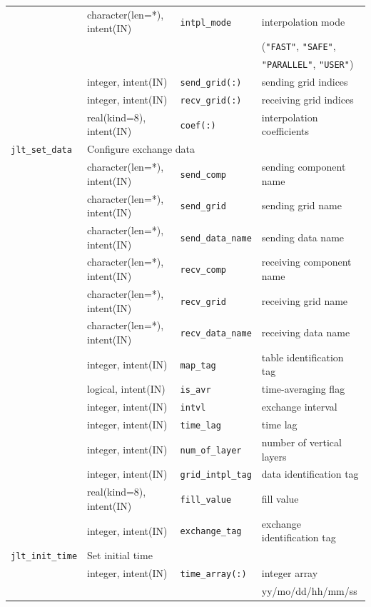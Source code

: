 \documentclass[11pt,a4paper]{report}
\begin{document}
\begin{table}[H]
\begin{center}
{\begin{tabular}{llll}
                & character(len=*), intent(IN) & \texttt{intpl\_mode} & interpolation mode\\
                &  &  & (\texttt{"FAST"}, \texttt{"SAFE"},\\
                &  &  & \texttt{"PARALLEL"}, \texttt{"USER"})\\
                & integer, intent(IN) & \texttt{send\_grid(:)} & sending grid indices\\
                & integer, intent(IN) & \texttt{recv\_grid(:)} & receiving grid indices\\
                & real(kind=8), intent(IN) & \texttt{coef(:)} & interpolation coefficients\\
\hline
 \texttt{jlt\_set\_data} & \multicolumn{3}{l}{Configure exchange data} \\
                & character(len=*), intent(IN) & \texttt{send\_comp} & sending component name\\
                & character(len=*), intent(IN) & \texttt{send\_grid} & sending grid name\\
                & character(len=*), intent(IN) & \texttt{send\_data\_name} & sending data name\\
                & character(len=*), intent(IN) & \texttt{recv\_comp} & receiving component name\\
                & character(len=*), intent(IN) & \texttt{recv\_grid} & receiving grid name\\
                & character(len=*), intent(IN) & \texttt{recv\_data\_name} & receiving data name\\
                & integer, intent(IN) & \texttt{map\_tag} & table identification tag\\
                & logical, intent(IN) & \texttt{is\_avr} & time-averaging flag\\
                & integer, intent(IN) & \texttt{intvl} & exchange interval\\
                & integer, intent(IN) & \texttt{time\_lag} & time lag\\
                & integer, intent(IN) & \texttt{num\_of\_layer} & number of vertical layers\\
                & integer, intent(IN) & \texttt{grid\_intpl\_tag} & data identification tag\\
                & real(kind=8), intent(IN) & \texttt{fill\_value} & fill value\\
                & integer, intent(IN) & \texttt{exchange\_tag} & exchange identification tag\\
\hline
 \texttt{jlt\_init\_time} &  \multicolumn{3}{l}{Set initial time}\\
                & integer, intent(IN) & \texttt{time\_array(:)} & integer array \\
                &                     &                & yy/mo/dd/hh/mm/ss\\
\hline\hline
\end{tabular}
}
\end{center}
\end{table}
\end{document}
